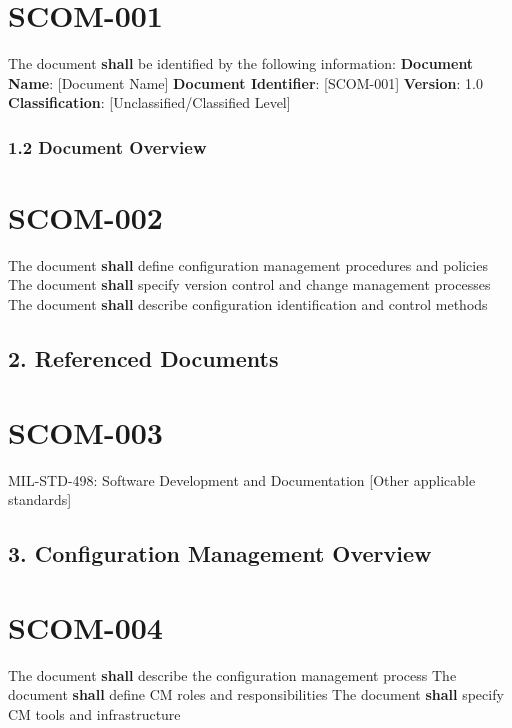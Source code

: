 \section{SCOM-001}\label{SCOM-001}

The document \textbf{shall} be identified by the following information:
\textbf{Document Name}: [Document Name]
\textbf{Document Identifier}: [SCOM-001]
\textbf{Version}: 1.0
\textbf{Classification}: [Unclassified/Classified Level]

\subsubsection{1.2 Document Overview}

\section{SCOM-002}\label{SCOM-002}

The document \textbf{shall} define configuration management procedures and policies
The document \textbf{shall} specify version control and change management processes
The document \textbf{shall} describe configuration identification and control methods

\subsection{2. Referenced Documents}

\section{SCOM-003}\label{SCOM-003}

MIL-STD-498: Software Development and Documentation
[Other applicable standards]\\

\subsection{3. Configuration Management Overview}

\section{SCOM-004}\label{SCOM-004}

The document \textbf{shall} describe the configuration management process
The document \textbf{shall} define CM roles and responsibilities
The document \textbf{shall} specify CM tools and infrastructure

